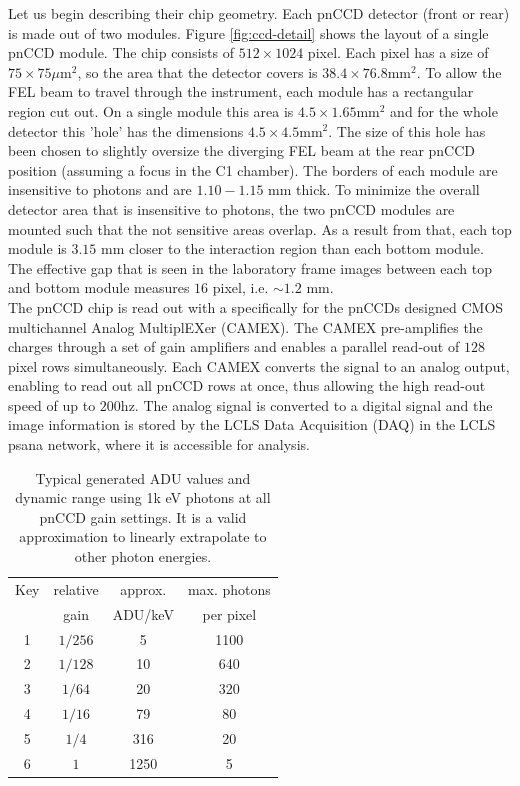 Let us begin describing their chip geometry. Each pnCCD detector (front or rear) is made out of two modules. Figure \ref{fig:ccd-detail} shows the layout of a single pnCCD module. The chip consists of $512 \times 1024$ pixel. Each pixel has a size of $75 \times 75 \mu \mathrm{m}^2$, so the area that the detector covers is $38.4 \times 76.8 \mathrm{mm}^{2}$. To allow the FEL beam to travel through the instrument, each module has a rectangular region cut out. On a single module this area is $4.5 \times 1.65 \mathrm{mm}^{2}$ and for the whole detector this 'hole' has the dimensions $4.5 \times 4.5 \mathrm{mm}^{2}$. The size of this hole has been chosen to slightly oversize the diverging FEL beam at the rear pnCCD position (assuming a focus in the C1 chamber). The borders of each module are insensitive to photons and are $1.10 - 1.15$ mm thick. To minimize the overall detector area that is insensitive to photons, the two pnCCD modules are mounted such that the not sensitive areas overlap. As a result from that, each top module is $3.15$ mm closer to the interaction region than each bottom module. The effective gap that is seen in the laboratory frame images between each top and bottom module measures $16$ pixel, i.e. $\sim 1.2$ mm.\\
The pnCCD chip is read out with a specifically for the pnCCDs designed CMOS multichannel Analog MultiplEXer (CAMEX). The CAMEX pre-amplifies the charges through a set of gain amplifiers and enables a parallel read-out of $128$ pixel rows simultaneously. Each CAMEX converts the signal to an analog output, enabling to read out all pnCCD rows at once, thus allowing the high read-out speed of up to $200$hz. The analog signal is converted to a digital signal and the image information is stored by the LCLS Data Acquisition (DAQ) in the LCLS psana network, where it is accessible for analysis.\\
\begin{table}%
\centering
\begin{tabular}{ |c c c c |}
 \hline
 Key & relative  & approx.  & max. photons \\ 
     &   gain    & ADU/keV  & per pixel  \\
 \hline
 1 & $1/256$ & 5 & 1100  \\
 2 & $1/128$ & 10 & 640   \\
 3 & $1/64$ & 20 & 320   \\
 4 & $1/16$ & 79 & 80  \\
 5 & $1/4$ & 316 & 20  \\
 6 & $1$ & 1250 & 5  \\
 \hline
\end{tabular}
\caption[pnCCD gain modes and typical ADU values at 1k eV photons.]{Typical generated ADU values and dynamic range using 1k eV photons at all pnCCD gain settings. It is a valid approximation to linearly extrapolate to other photon energies.}
\label{tab:gain-modes}
\end{table}
